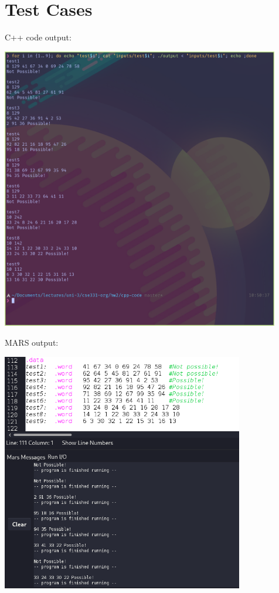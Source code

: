 \documentclass[11pt]{article}
\begin{document}
\newpage

\section{Test Cases}
\label{sec:orgee3402c}

C++ code output:

\begin{center}
\includegraphics[width=460px]{Test_Cases/2020-11-27_10-52-36_screenshot.png}
\end{center}


\newpage

MARS output:

\begin{center}
\includegraphics[width=400px]{Test_Cases/2020-11-27_11-03-36_screenshot.png}
\end{center}
\end{document}
